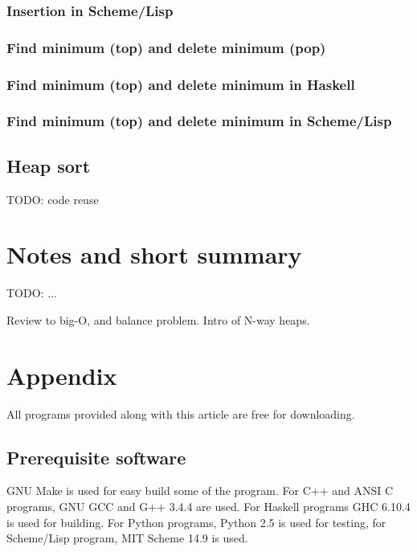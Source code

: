 \documentclass{article}
\begin{document}
\subsubsection*{Insertion in Scheme/Lisp}

\subsubsection{Find minimum (top) and delete minimum (pop)}

\subsubsection*{Find minimum (top) and delete minimum in Haskell}

\subsubsection*{Find minimum (top) and delete minimum in Scheme/Lisp}

\subsection{Heap sort}

TODO: code reuse

\section{Notes and short summary}

TODO: ...

Review to big-O, and balance problem.
Intro of N-way heaps.


\section{Appendix} \label{appendix}
All programs provided along with this article are free for
downloading.

\subsection{Prerequisite software}
GNU Make is used for easy build some of the program. For C++ and ANSI C programs,
GNU GCC and G++ 3.4.4 are used. 
For Haskell programs GHC 6.10.4 is used
for building. For Python programs, Python 2.5 is used for testing, for
Scheme/Lisp program, MIT Scheme 14.9 is used.
\end{document}
